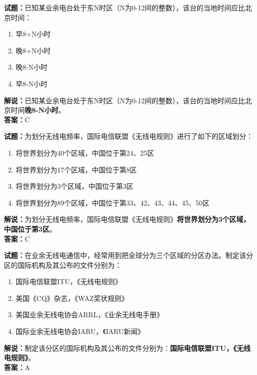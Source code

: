 \documentclass{ctexbook}
\begin{document}
\bigskip


\noindent\textbf{试题：}已知某业余电台处于东N时区（N为0-12间的整数），该台的当地时间应比北京时间：
\begin{enumerate}[leftmargin=3em]
\item 早8+N小时
\item 晚8+N小时
\item 晚8-N小时
\item 早8-N小时
\end{enumerate}
\noindent\textbf{解说：}已知某业余电台处于东N时区（N为0-12间的整数），该台的当地时间应比北京时间\textbf{晚8-N小时}。\\\noindent\textbf{答案：}C



\bigskip


\noindent\textbf{试题：}为划分无线电频率，国际电信联盟《无线电规则》进行了如下的区域划分：
\begin{enumerate}[leftmargin=3em]
\item 将世界划分为40个区域，中国位于第24、25区
\item 将世界划分为17个区域，中国位于第8区
\item 将世界划分为3个区域，中国位于第3区
\item 将世界划分为89个区域，中国位于第33、42、43、44、45、50区
\end{enumerate}
\noindent\textbf{解说：}为划分无线电频率，国际电信联盟《无线电规则》\textbf{将世界划分为3个区域，中国位于第3区}。\\\noindent\textbf{答案：}C



\bigskip


\noindent\textbf{试题：}在业余无线电通信中，经常用到把全球分为三个区域的分区办法。制定该分区的国际机构及其公布的文件分别为：
\begin{enumerate}[leftmargin=3em]
\item 国际电信联盟ITU，《无线电规则》
\item 美国《CQ》杂志，《WAZ奖状规则》
\item 美国业余无线电协会ARRL，《业余无线电手册》
\item 国际业余无线电协会IARU，《IARU新闻》
\end{enumerate}
\noindent\textbf{解说：}制定该分区的国际机构及其公布的文件分别为：\textbf{国际电信联盟ITU，《无线电规则》}。\\\noindent\textbf{答案：}A




\bigskip
\end{document}
